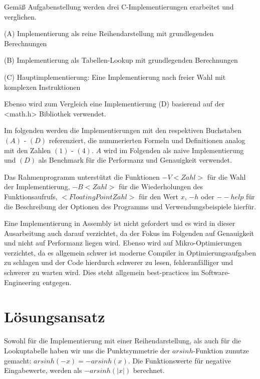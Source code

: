 \documentclass[course=erap] {aspdoc}
\begin{document}
 
     Gemäß Aufgabenstellung werden drei C-Implementierungen erarbeitet und verglichen.
 
 
     (A) Implementierung als reine Reihendarstellung mit grundlegenden Berechnungen
 
 
     (B) Implementierung als Tabellen-Lookup mit grundlegenden Berechnungen
 
 
     (C) Hauptimplementierung: Eine Implementierung nach freier Wahl mit komplexen Instruktionen
 
     Ebenso wird zum Vergleich eine Implementierung (D) basierend auf der <math.h> Bibliothek verwendet.
 
     Im folgenden werden die Implementierungen mit den respektiven Buchstaben $(A)$ - $(D)$ referenziert, die nummerierten Formeln und Definitionen analog mit den Zahlen $(1)$ - $(4)$. 
     $A$ wird im Folgenden als naive Implementierung und $(D)$ als Benchmark für die Performanz und Genauigkeit verwendet. 
 
 
     Das Rahmenprogramm unterstützt die Funktionen $-V<Zahl>$ für die Wahl der Implementierung, $-B<Zahl>$ für die Wiederholungen des Funktionsaufrufs, $<Floating Point Zahl>$ für den Wert $x$, $-h$ oder $--help$ für die Beschreibung der Optionen des Programms und Verwendungsbeispiele hierfür.
    
 
     Eine Implementierung in Assembly ist nicht gefordert und es wird in dieser Ausarbeitung auch darauf verzichtet, da der Fokus im Folgenden auf Genauigkeit und nicht auf Performanz liegen wird.
     Ebenso wird auf Mikro-Optimierungen verzichtet, da es allgemein schwer ist moderne Compiler in Optimierungsaufgaben zu schlagen und der Code hierdurch schwerer zu lesen, fehleranfälliger und schwerer zu warten wird.
     Dies steht allgemein best-practices im Software-Engineering entgegen.
 
 
     \section{Lösungsansatz}
 
     Sowohl für die Implementierung mit einer Reihendarstellung, als auch für die Lookuptabelle haben wir uns die Punktsymmetrie der $arsinh$-Funktion zunutze gemacht: $arsinh(-x) = -arsinh(x)$. Die Funktionswerte für negative Eingabewerte, werden als $-arsinh(|x|)$ berechnet.
\end{document}
